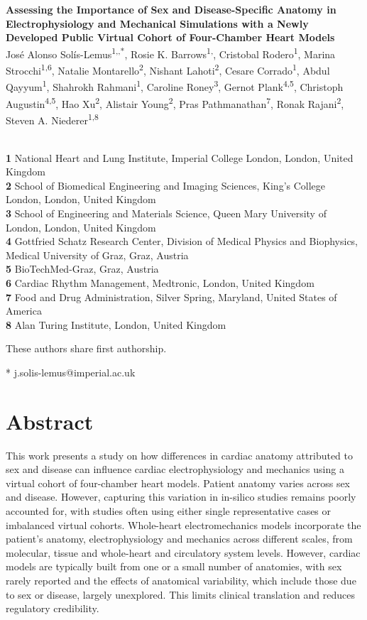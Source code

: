 \documentclass[10pt,letterpaper]{article}
\newcommand{\autor}{%
    Jos\'e Alonso Sol\'is-Lemus\textsuperscript{1,\Cross,*},
    Rosie K. Barrows\textsuperscript{1,\Cross},
    Cristobal Rodero\textsuperscript{1},
    Marina Strocchi\textsuperscript{1,6},
    Natalie Montarello\textsuperscript{2},
    Nishant Lahoti\textsuperscript{2},
    Cesare Corrado\textsuperscript{1},
    Abdul Qayyum\textsuperscript{1},
    Shahrokh Rahmani\textsuperscript{1},
    Caroline Roney\textsuperscript{3},
    Gernot Plank\textsuperscript{4,5},
    Christoph Augustin\textsuperscript{4,5},
    Hao Xu\textsuperscript{2},
    Alistair Young\textsuperscript{2},
    Pras Pathmanathan\textsuperscript{7},
    Ronak Rajani\textsuperscript{2},
    Steven A. Niederer\textsuperscript{1,8}%
}
\newcommand{\titulo}{%
    Assessing the Importance of Sex and Disease-Specific Anatomy in
    Electrophysiology and Mechanical Simulations with a Newly Developed
    Public Virtual Cohort of Four-Chamber Heart Models%
}
\begin{document}
\vspace*{0.2in}

\begin{flushleft}
{\Large\textbf{\titulo}}
\newline
\\
\autor
\\
\bigskip
\textbf{1} National Heart and Lung Institute, Imperial College London, London, United Kingdom \\
\textbf{2} School of Biomedical Engineering and Imaging Sciences, King's College London, London, United Kingdom \\
\textbf{3} School of Engineering and Materials Science, Queen Mary University of London, London, United Kingdom \\
\textbf{4} Gottfried Schatz Research Center, Division of Medical Physics and Biophysics, Medical University of Graz, Graz, Austria \\
\textbf{5} BioTechMed-Graz, Graz, Austria \\
\textbf{6} Cardiac Rhythm Management, Medtronic, London, United Kingdom\\
\textbf{7} Food and Drug Administration, Silver Spring, Maryland, United States of America\\
\textbf{8} Alan Turing Institute, London, United Kingdom \\
\bigskip

\Cross These authors share first authorship.

* j.solis-lemus@imperial.ac.uk
\end{flushleft}

\section*{Abstract}
    This work presents a study on how differences in cardiac
    anatomy attributed to sex and disease can influence cardiac
    electrophysiology and mechanics using a virtual cohort of four-chamber
    heart models.
    Patient anatomy varies across sex and disease.
    However, capturing this variation in in-silico studies remains poorly accounted for,
    with studies often using either single representative cases or imbalanced virtual cohorts.
    Whole-heart electromechanics models incorporate the patient's anatomy,
    electrophysiology and mechanics across different scales, from molecular,
    tissue and whole-heart and circulatory system levels.
    However, cardiac models are typically built from one or a small number of anatomies,
    with sex rarely reported and the effects of anatomical variability, which include those due to
    sex or disease, largely unexplored.
    This limits clinical translation and reduces regulatory credibility.
\end{document}
